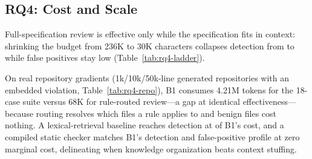 \documentclass[11pt]{article}
\begin{document}
\subsection{RQ4: Cost and Scale}
Full-specification review is effective only while the specification fits in
context: shrinking the budget from 236K to 30K characters collapses detection
from \budFullDet{} to \budThirtyKDet{} while false positives stay low
(Table~\ref{tab:rq4-ladder}).

\begin{table}[t]
\centering
\caption{Context budget ladder (react19 40-case suite): detection collapses as
the specification is truncated.}
\label{tab:rq4-ladder}

\end{table}

On real repository gradients
(1k/10k/50k-line generated repositories with an embedded violation, Table~\ref{tab:rq4-repo}),
B1 consumes 4.21M tokens for the 18-case suite versus 68K for rule-routed
review---a \repoGap{} gap at identical effectiveness---because routing resolves which files
a rule applies to and benign files cost nothing. A lexical-retrieval baseline
reaches \bTwoDet{} detection at \bTwoCostPct{} of B1's cost, and a compiled static checker
matches B1's detection and false-positive profile at zero marginal cost,
delineating when knowledge organization beats context stuffing.

\begin{table}[t]
\centering
\caption{Repository gradient (18 RP cases across 1k/10k/50k-line repositories):
the static checker covers 9 of 12 rules without any LLM call.}
\label{tab:rq4-repo}

\end{table}
\end{document}
